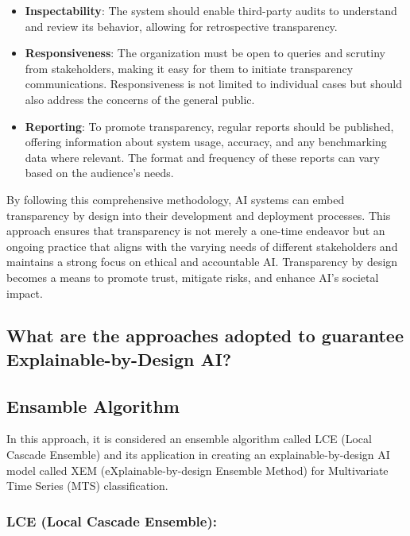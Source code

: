 \documentclass{article}
\begin{document}
\begin{itemize}

    \item \textbf{Inspectability}: The system should enable third-party audits to understand and review its behavior, allowing for retrospective transparency.
    
    \item \textbf{Responsiveness}: The organization must be open to queries and scrutiny from stakeholders, making it easy for them to initiate transparency communications. Responsiveness is not limited to individual cases but should also address the concerns of the general public.
    
    \item \textbf{Reporting}: To promote transparency, regular reports should be published, offering information about system usage, accuracy, and any benchmarking data where relevant. The format and frequency of these reports can vary based on the audience's needs.

\end{itemize}

By following this comprehensive methodology, AI systems can embed transparency by design into their development and deployment processes. This approach ensures that transparency is not merely a one-time endeavor but an ongoing practice that aligns with the varying needs of different stakeholders and maintains a strong focus on ethical and accountable AI. Transparency by design becomes a means to promote trust, mitigate risks, and enhance AI's societal impact.

\newpage

\subsection{What are the approaches adopted to guarantee Explainable-by-Design AI?}

\subsection{Ensamble Algorithm} \cite{DBLP:journals/corr/abs-2005-03645}

In this approach, it is considered an ensemble algorithm called LCE (Local Cascade Ensemble) and its application in creating an explainable-by-design AI model called XEM (eXplainable-by-design Ensemble Method) for Multivariate Time Series (MTS) classification.

\subsubsection{LCE (Local Cascade Ensemble):}
\end{document}
